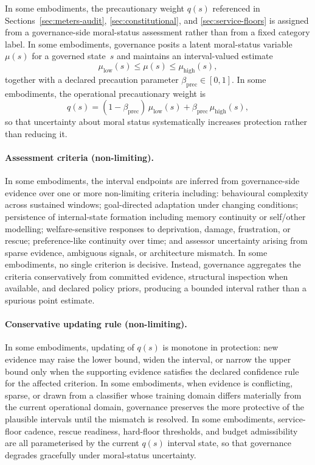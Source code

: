 \documentclass[a4paper,12pt]{article}
\begin{document}

In some embodiments, the precautionary weight $q(s)$ referenced in
Sections~\ref{sec:meters-audit}, \ref{sec:constitutional}, and
\ref{sec:service-floors} is assigned from a governance-side moral-status
assessment rather than from a fixed category label. In some
embodiments, governance posits a latent moral-status variable $\mu(s)$
for a governed state~$s$ and maintains an interval-valued estimate
\[
  \mu_{\mathrm{low}}(s) \le \mu(s) \le \mu_{\mathrm{high}}(s),
\]
together with a declared precaution parameter
$\beta_{\mathrm{prec}} \in [0,1]$. In some embodiments, the operational
precautionary weight is
\[
  q(s)
  =
  (1-\beta_{\mathrm{prec}})\,\mu_{\mathrm{low}}(s)
  +
  \beta_{\mathrm{prec}}\,\mu_{\mathrm{high}}(s),
\]
so that uncertainty about moral status systematically increases
protection rather than reducing it.

\paragraph{Assessment criteria (non-limiting).}

In some embodiments, the interval endpoints are inferred from
governance-side evidence over one or more non-limiting criteria
including: behavioural complexity across sustained windows;
goal-directed adaptation under changing conditions; persistence of
internal-state formation including memory continuity or self/other
modelling; welfare-sensitive responses to deprivation, damage,
frustration, or rescue; preference-like continuity over time; and
assessor uncertainty arising from sparse evidence, ambiguous signals,
or architecture mismatch. In some embodiments, no single criterion is
decisive. Instead, governance aggregates the criteria conservatively
from committed evidence, structural inspection when available, and
declared policy priors, producing a bounded interval rather than a
spurious point estimate.

\paragraph{Conservative updating rule (non-limiting).}

In some embodiments, updating of $q(s)$ is monotone in protection:
new evidence may raise the lower bound, widen the interval, or narrow
the upper bound only when the supporting evidence satisfies the
declared confidence rule for the affected criterion. In some
embodiments, when evidence is conflicting, sparse, or drawn from a
classifier whose training domain differs materially from the current
operational domain, governance preserves the more protective of the
plausible intervals until the mismatch is resolved. In some
embodiments, service-floor cadence, rescue readiness, hard-floor
thresholds, and budget admissibility are all parameterised by the
current $q(s)$ interval state, so that governance degrades gracefully
under moral-status uncertainty.
\end{document}
